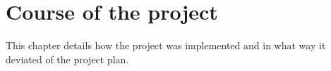 \section{Course of the project} \label{projectCourse}
This chapter details how the project was implemented and in what way it deviated of the project plan.



